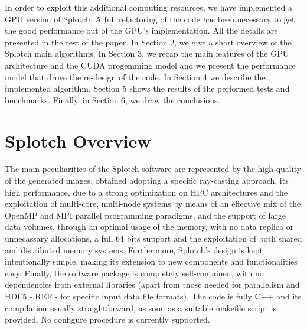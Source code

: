 \documentclass[11pt]{article}
\begin{document}
In order to exploit this additional computing resources, we have implemented 
a GPU version of Splotch. A full refactoring of the code has been necessary 
to get the good performance out of the GPU's implementation. 
All the details are presented in the rest of the paper. In Section 2, we give a short 
overview of the Splotch main algorithms. In Section 3, we recap the main features
of the GPU architecture and the CUDA progemming model
and we present the performance model that drove the 
re-design of the code. In Section 4 
we describe the implemented algorithm. Section 5 shows
the results of the performed tests and benchmarks. Finally, in Section 6, we draw 
the conclusions. 

\section{Splotch Overview}

The main peculiarities of the Splotch software are represented by the 
high quality of the generated images, obtained adopting a specific ray-casting 
approach, its high performance, due to a strong optimization on HPC architectures and the exploitation of multi-core, multi-node 
systems by means of an effective mix of the OpenMP and MPI parallel programming paradigms, and
the support of large data volumes, through an optimal usage of the memory, with
no data replica or unnecassary allocations, a full 64 bits support and the exploitation
of both shared and distributed memory systems. Furthermore, Splotch's design is kept 
intentionally simple, making its extension to new components and functionalities easy. 
Finally, the software package is completely self-contained, with no dependencies from external 
libraries (apart from those needed for parallelism and HDF5 - REF - for
specific input data file formats). The code is fully C++ and its compilation
usually straightforward, as soon as a suitable makefile script is provided.
No configure procedure is currently supported.
\end{document}
